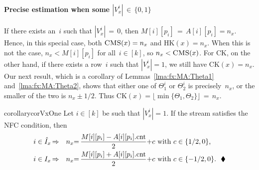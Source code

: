 \paragraph{Precise estimation when some $|V^i_x| \,{\in}\, \{0,1\}$}
If there exists an~$i$ such that $\left|{V_x^i}\right|\,{=}\,0$, then $M[i][p_i]\,{=}\,A[i][p_i]=n_x$.  Hence, in this special case, both $\textnormal{\textsc{CMS}}(x)=n_x$ and $\mathrm{HK}(x)=n_x$.  When this is not the case, $n_x < M[i][p_i]$ for all~$i\in[k]$, so $n_x < \textnormal{\textsc{CMS}}(x)$.  For CK, on the other hand, if there exists a row~$i$ such that $|V^i_x|=1$, we still have $\mathrm{CK}(x)=n_x$.  Our next result, which is a corollary of Lemmas~\ref{lma:fx:MA:Theta1} and~\ref{lma:fx:MA:Theta2}, shows that either one of $\Theta_1^i$ or $\Theta_2^i$ is precisely~$n_x$, or the smaller of the two is $n_x \pm 1/2$.  Thus $\mathrm{CK}(x)=\lfloor \min\{\Theta_1,\Theta_2\} \rfloor\,{=}\,n_x$. 
\begin{restatable}{corollary}{corVxOne}\label{cor:fx:MA:Theta13:nx} Let $i \in [k]$ be such that $|V_x^i|=1$. If the stream satisfies the NFC condition, then
	\begin{align*}
		i \in \hat{I}_x &\,{\Rightarrow}&
				n_x&{=}\,\frac{M[i][p_i] - A[i][p_i].\textup{cnt}}{2} {+} c \mbox{ with $c \in \{1/2, 0\}$,} \\
		i \in I_x &\,{\Rightarrow}&
				 n_x&{=}\,\frac{M[i][p_i] + A[i][p_i].\textup{cnt}}{2} {+} c \mbox{ with $c \in \{-1/2,0\}$.} \ \ \blacklozenge
		\end{align*} 
	\hfill
\end{restatable}

